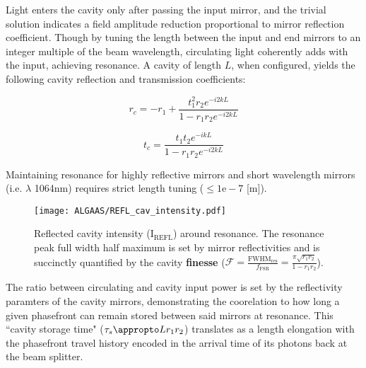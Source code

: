 Light enters the cavity only after passing the input mirror, and the trivial solution indicates a field amplitude reduction proportional to mirror reflection coefficient. Though by tuning the length between the input and end mirrors to an integer multiple of the beam wavelength, circulating light coherently adds with the input, achieving resonance.  A cavity of length $L$, when configured, yields the following cavity reflection and transmission coefficients: 

\iffalse that the input and circulating that the photons belonging to a particular phasefront can be experimentally tracked, and lucky for us this is is why we measure interference at the anti-symmetric port. But these benefit with a constant source at the cavity input the phasefronts entering the cavity are superimposed onto the circulating cavity field and, more often than not, add incoherently which can makes this thought experiment seem silly.\fi 

\begin{equation}
	r_c = -r_1 + \frac{t^2_1r_2 e^{-i2kL}}{1-r_1 r_2 e^{-i2kL}}
\end{equation}

\begin{equation}
	t_c = \frac{t_1 t_2 e^{-ikL}}{1-r_1 r_2 e^{-i2kL}}	
\end{equation}

Maintaining resonance for highly reflective mirrors and short wavelength mirrors (i.e. $\lambda$ 1064nm) requires strict length tuning ($\leq 1\mathrm{e-}7$ [m]). 

\begin{figure}[H]
\texttt{[image: ALGAAS/REFL\_cav\_intensity.pdf]}
\caption{Reflected cavity intensity (I$_\mathrm{REFL}$) around resonance. The resonance peak full width half maximum is set by mirror reflectivities and is succinctly quantified by the cavity \textbf{finesse} ($\mathscr{F} = \frac{\mathrm{FWHM}_\mathrm{res}}{f_\mathrm{FSR}} = \frac{\pi \sqrt{r_1 r_2}}{1-r_1 r_2}$).}
\label{fig:cav_length_response_DCpow}
\end{figure}

The ratio between circulating and cavity input power is set by the reflectivity paramters of the cavity mirrors, demonstrating the coorelation to how long a given phasefront can remain stored between said mirrors at resonance. This ``cavity storage time" ($\tau_s \appropto L r_1 r_2$) translates as a length elongation with the phasefront travel history encoded in the arrival time of its photons back at the beam splitter.

